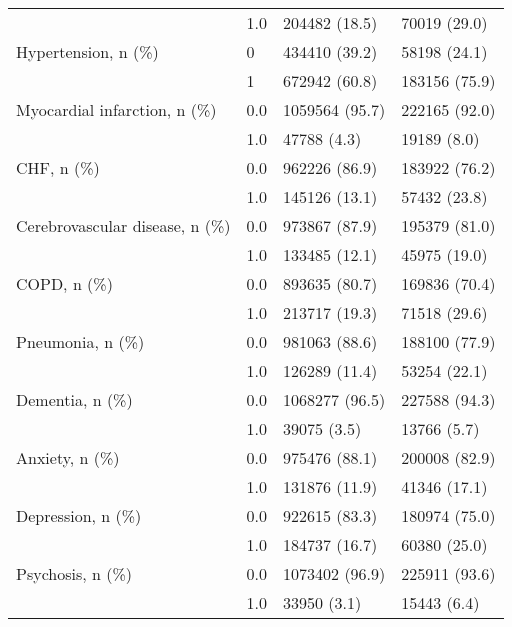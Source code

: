 \begin{tabular}{llll}
                                       & 1.0 &            204482 (18.5) &      70019 (29.0) \\
Hypertension, n (\%) & 0 &            434410 (39.2) &      58198 (24.1) \\
                                       & 1 &            672942 (60.8) &     183156 (75.9) \\
Myocardial infarction, n (\%) & 0.0 &           1059564 (95.7) &     222165 (92.0) \\
                                       & 1.0 &              47788 (4.3) &       19189 (8.0) \\
CHF, n (\%) & 0.0 &            962226 (86.9) &     183922 (76.2) \\
                                       & 1.0 &            145126 (13.1) &      57432 (23.8) \\
Cerebrovascular disease, n (\%) & 0.0 &            973867 (87.9) &     195379 (81.0) \\
                                       & 1.0 &            133485 (12.1) &      45975 (19.0) \\
COPD, n (\%) & 0.0 &            893635 (80.7) &     169836 (70.4) \\
                                       & 1.0 &            213717 (19.3) &      71518 (29.6) \\
Pneumonia, n (\%) & 0.0 &            981063 (88.6) &     188100 (77.9) \\
                                       & 1.0 &            126289 (11.4) &      53254 (22.1) \\
Dementia, n (\%) & 0.0 &           1068277 (96.5) &     227588 (94.3) \\
                                       & 1.0 &              39075 (3.5) &       13766 (5.7) \\
Anxiety, n (\%) & 0.0 &            975476 (88.1) &     200008 (82.9) \\
                                       & 1.0 &            131876 (11.9) &      41346 (17.1) \\
Depression, n (\%) & 0.0 &            922615 (83.3) &     180974 (75.0) \\
                                       & 1.0 &            184737 (16.7) &      60380 (25.0) \\
Psychosis, n (\%) & 0.0 &           1073402 (96.9) &     225911 (93.6) \\
                                       & 1.0 &              33950 (3.1) &       15443 (6.4) \\

\end{tabular}
